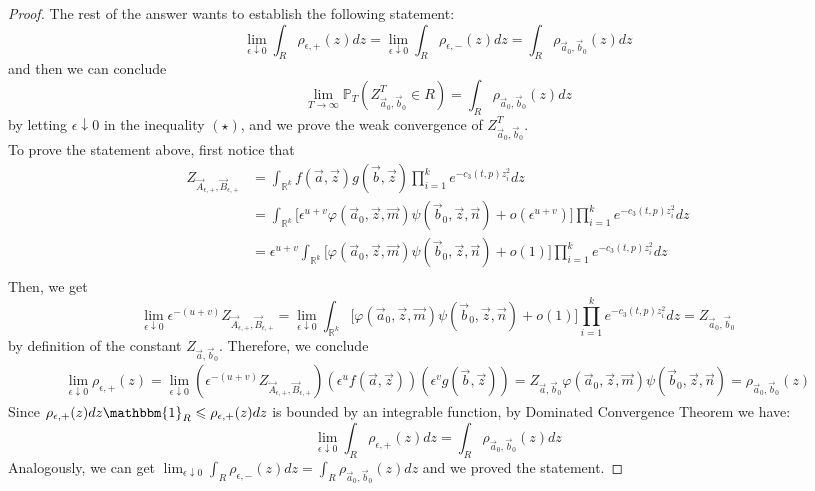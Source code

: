 \begin{proof}
The rest of the answer wants to establish the following statement:
$$\lim_{\epsilon\downarrow 0}\int_{R}\rho_{\epsilon,+}(z)dz=\lim_{\epsilon\downarrow 0}\int_{R}\rho_{\epsilon,-}(z)dz=\int_{R}\rho_{\vec{a}_{0},\vec{b}_{0}}(z)dz$$ and then we can conclude $$\lim_{T\rightarrow\infty}\mathbb{P}_{T}(Z^{T}_{\vec{a}_{0},\vec{b}_{0}}\in R)=\int_{R}\rho_{\vec{a}_{0},\vec{b}_{0}}(z)dz$$ by letting $\epsilon\downarrow 0$ in the inequality $(\star)$, and we prove the weak convergence of $Z^{T}_{\vec{a}_{0},\vec{b}_{0}}$.\\
To prove the statement above, first notice that
\begin{align*}
	Z_{\vec{A}_{\epsilon,+},\vec{B}_{\epsilon,+}}&=\int_{\mathbb{R}^{k}}f(\vec{a},\vec{z})g(\vec{b},\vec{z})\prod_{i=1}^{k}e^{-c_{3}(t,p)z^{2}_{i}}dz\\
	&=\int_{\mathbb{R}^{k}}\big[\epsilon^{u+v}\varphi(\vec{a}_{0},\vec{z},\vec{m})\psi(\vec{b}_{0},\vec{z},\vec{n})+o(\epsilon^{u+v})\big]\prod_{i=1}^{k}e^{-c_{3}(t,p)z^{2}_{i}}dz\\
	&=\epsilon^{u+v}\int_{\mathbb{R}^{k}}\big[\varphi(\vec{a}_{0},\vec{z},\vec{m})\psi(\vec{b}_{0},\vec{z},\vec{n})+o(1)\big]\prod_{i=1}^{k}e^{-c_{3}(t,p)z^{2}_{i}}dz\\
\end{align*}
Then, we get
$$\lim_{\epsilon\downarrow 0} \epsilon^{-(u+v)} Z_{\vec{A}_{\epsilon,+},\vec{B}_{\epsilon,+}}=\lim_{\epsilon\downarrow 0}\int_{\mathbb{R}^{k}}\big[\varphi(\vec{a}_{0},\vec{z},\vec{m})\psi(\vec{b}_{0},\vec{z},\vec{n})+o(1)\big]\prod_{i=1}^{k}e^{-c_{3}(t,p)z^{2}_{i}}dz=Z_{\vec{a}_{0},\vec{b}_{0}}$$
by definition of the constant $Z_{\vec{a},\vec{b}_{0}}$.
Therefore, we conclude
\begin{align*}
	\lim_{\epsilon\downarrow 0}\rho_{\epsilon,+}(z)=\lim_{\epsilon\downarrow 0}(\epsilon^{-(u+v)}Z_{\vec{A}_{\epsilon,+},\vec{B}_{\epsilon,+}})(\epsilon^{u}f(\vec{a},\vec{z}))(\epsilon^{v}g(\vec{b},\vec{z}))=Z_{\vec{a},\vec{b}_{0}}\varphi(\vec{a}_{0},\vec{z},\vec{m})\psi(\vec{b}_{0},\vec{z},\vec{n})=\rho_{\vec{a}_{0},\vec{b}_{0}}(z)
\end{align*}
Since $\rho_{\epsilon,+}(z)dz\mathbbm{1}_{R}\leqslant\rho_{\epsilon,+}(z)dz$ is bounded by an integrable function, by Dominated Convergence Theorem we have: $$\lim_{\epsilon\downarrow 0}\int_{R}\rho_{\epsilon,+}(z)dz=\int_{R}\rho_{\vec{a}_{0},\vec{b}_{0}}(z)dz$$ Analogously, we can get $\lim_{\epsilon\downarrow 0}\int_{R}\rho_{\epsilon,-}(z)dz=\int_{R}\rho_{\vec{a}_{0},\vec{b}_{0}}(z)dz$ and we proved the statement.
\end{proof}


